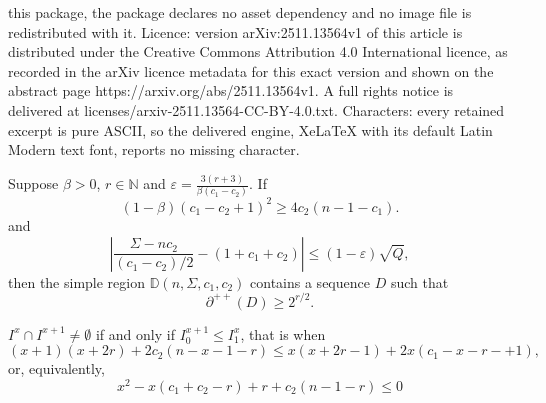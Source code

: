 \documentclass[10pt,a4paper]{amsart}
\def\mD{\mathbb{D}}
\newcommand{\pppp}[1]{\partial^{++}(#1)}
\begin{document}
this package, the package declares no asset dependency and no image file is redistributed with it. Licence: version arXiv:2511.13564v1 of this article is distributed under the Creative Commons Attribution 4.0 International licence, as recorded in the arXiv licence metadata for this exact version and shown on the abstract page https://arxiv.org/abs/2511.13564v1. A full rights notice is delivered at licenses/arxiv-2511.13564-CC-BY-4.0.txt. Characters: every retained excerpt is pure ASCII, so the delivered engine, XeLaTeX with its default Latin Modern text font, reports no missing character.
\begin{theorem}\label{thm:sigmabound}
    Suppose $\beta > 0$,  $r\in \mathbb N$ and
    $\varepsilon = \tfrac{3(r+3)}{\beta(c_1 - c_2)}$.
    If
    \begin{equation}\label{eq:beta}
        (1-\beta)(c_1 - c_2 + 1)^2 \geq 4c_2(n - 1 - c_1).
    \end{equation}
    and
    \begin{equation}\label{eq:sigma_abs_bound}
    \left| \frac{\Sigma - n c_2}{(c_1 - c_2)/2} - (1 + c_1 + c_2) \right|
        \leq (1 - \varepsilon)\sqrt{Q},
    \end{equation}
    then
     the simple region $\mD(n,\Sigma,c_1,c_2)$ contains a sequence $D$ such that
    \begin{equation}\label{eq:notstable}
       \pppp D \ge  2^{r/2}.
        \end{equation}
        \end{theorem}

\begin{claim}
    $I^x \cap I^{x+1} \neq \emptyset$ if and only if $I^{x+1}_0 \leq I^{x}_1$, that is when
    \[ (x+1)(x+2r)+2c_2(n-x-1-r) \leq x(x+2r-1) + 2x(c_1-x-r-+1),\]
    or, equivalently,
    \begin{equation}\label{eq:newxbound}
        x^2-x(c_1+c_2-r)+r + c_2(n-1-r) \leq 0
    \end{equation}
\end{claim}
\end{document}
